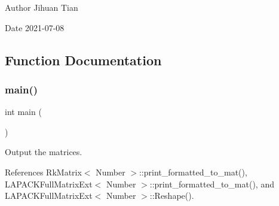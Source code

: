 \begin{DoxyAuthor}{Author}
Jihuan Tian 
\end{DoxyAuthor}
\begin{DoxyDate}{Date}
2021-\/07-\/08 
\end{DoxyDate}


\subsection{Function Documentation}
\mbox{\label{rkmatrix-agglomeration_8cc_ae66f6b31b5ad750f1fe042a706a4e3d4}} 
\subsubsection{\texorpdfstring{main()}{main()}}
{\footnotesize\ttfamily int main (\begin{DoxyParamCaption}{ }\end{DoxyParamCaption})}

Output the matrices.

References Rk\+Matrix$<$ Number $>$\+::print\+\_\+formatted\+\_\+to\+\_\+mat(), L\+A\+P\+A\+C\+K\+Full\+Matrix\+Ext$<$ Number $>$\+::print\+\_\+formatted\+\_\+to\+\_\+mat(), and L\+A\+P\+A\+C\+K\+Full\+Matrix\+Ext$<$ Number $>$\+::\+Reshape().

